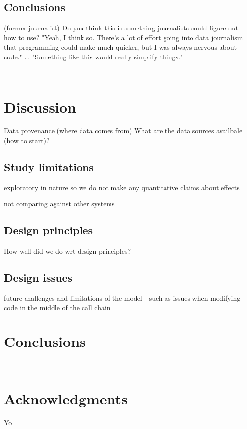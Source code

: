 \documentclass{sigchi}
\begin{document}
\subsection{Conclusions}
(former journalist)
Do you think this is something journalists could figure out how to use?
"Yeah, I think so. There's a lot of effort going into data journalism that programming could make much quicker,
but I was always nervous about code." ... "Something like this would really simplify things."

\newpage
~
\newpage


\section{Discussion}

Data provenance (where data comes from)
What are the data sources availbale (how to start)?

\subsection{Study limitations}
exploratory in nature so we do not make any quantitative claims about effects

not comparing against other systems

\subsection{Design principles}
How well did we do wrt design principles?

\subsection{Design issues}
future challenges and limitations of the model - such as issues when modifying code
in the middle of the call chain

\section{Conclusions}

\newpage
~
\newpage

\section{Acknowledgments}
Yo

\balance{}



\end{document}

